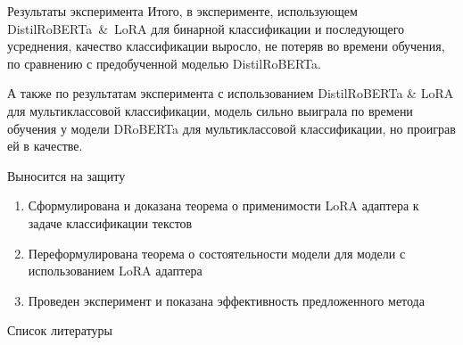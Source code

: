 \documentclass[9pt,pdf,hyperref={unicode}]{beamer}
\begin{document}
\begin{frame}{Результаты эксперимента}
Итого, в эксперименте, использующем DistilRoBERTa~\&~LoRA для бинарной классификации и последующего усреднения, качество классификации выросло, не потеряв во времени обучения, по сравнению с предобученной моделью DistilRoBERTa.


А также по результатам эксперимента с использованием DistilRoBERTa \& LoRA для мультиклассовой классификации, модель сильно выиграла по времени обучения у модели DRoBERTa для мультиклассовой классификации, но проиграв ей в качестве. 
\end{frame}






\begin{frame}{Выносится на защиту}
\justifying

	\begin{enumerate}
	\justifying
		\item Сформулирована и доказана теорема о применимости LoRA адаптера к задаче классификации текстов
        \item Переформулирована теорема о состоятельности модели для модели с использованием LoRA адаптера
        \item Проведен эксперимент и показана эффективность предложенного метода
	\end{enumerate}
\end{frame}
\begin{frame}{Список литературы}

 
\end{frame}

\end{document}
